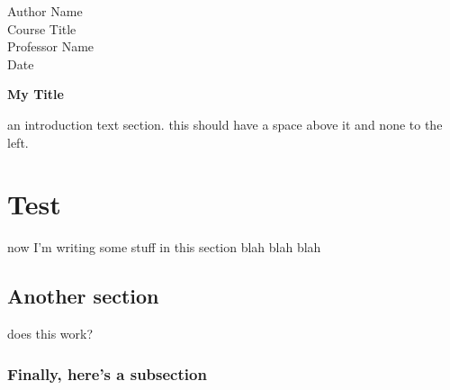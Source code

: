 \documentclass[12pt]{article}
\newcommand{\titletext}[1]
	{\begin{center}
			\textbf{#1}
	\end{center}}
\newcommand{\headertext}[4]
	{\begin{flushleft}
		   #1
		\\ #2
		\\ #3
		\\ #4
	\end{flushleft}}
\begin{document}
\headertext{Author Name}{Course Title}{Professor Name}{Date}

\titletext{My Title}
an introduction text section. this should have a space above it and none to the left.

\section{Test}
now I'm writing some stuff in this section blah blah blah

\subsection{Another section}
does this work?

\subsubsection{Finally, here's a subsection}
	
\end{document}
